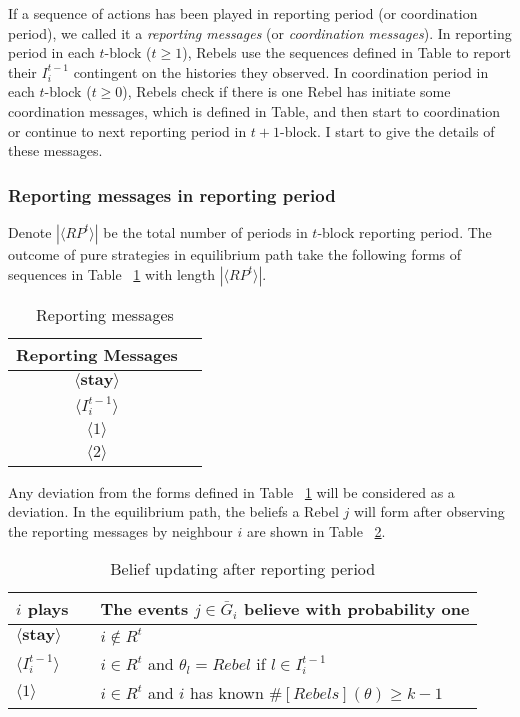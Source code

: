\documentclass[12pt,letter]{article}
\theoremstyle{definition}
\theoremstyle{remark}
\theoremstyle{claim}
\begin{document}
If a sequence of actions has been played in reporting period (or coordination period), we called it a \textit{reporting messages} (or \textit{coordination messages}). In reporting period in each $t$-block ($t\geq 1$), Rebels use the sequences defined in Table to report their $I^{t-1}_i$ contingent on the histories they observed. In coordination period in each $t$-block ($t\geq 0$), Rebels check if there is one Rebel has initiate some coordination messages, which is defined in Table, and then start to coordination or continue to next reporting period in $t+1$-block. I start to give the details of these messages.



\subsubsection*{Reporting messages in reporting period}

Denote $|\langle RP^t \rangle|$ be the total number of periods in $t$-block reporting period. The outcome of pure strategies in equilibrium path take the following forms of sequences in Table ~\ref{Table_msg_reporting} with length $|\langle RP^t \rangle|$.

\begin{table}[t]
\caption{Reporting messages}
\label{Table_msg_reporting}
\begin{center}
\begin{tabular}{c c }
Reporting Messages 		&   \\
\hline
$\langle  \textbf{stay} \rangle$ 	& 	 \\
$\langle  {I^{t-1}_i} \rangle$ 		&   \\
$\langle 1 \rangle$ 		             &   \\
$\langle 2 \rangle$ 		             &   
\end{tabular}
\end{center}
\end{table}
Any deviation from the forms defined in Table ~\ref{Table_msg_reporting} will be considered as a deviation. In the equilibrium path, the beliefs a Rebel $j$ will form after observing the reporting messages by neighbour $i$ are shown in Table ~\ref{Table_blf_up_reporting}.

\begin{table}[t]
\caption{Belief updating after reporting period}
\label{Table_blf_up_reporting}
\begin{center}
\begin{tabular}{l c l}
$i$ plays 		&  			& The events $j\in \bar{G}_i$ believe with probability one  \\
\hline
$\langle  \textbf{stay} \rangle$ 	& 			    & $i\notin R^t$  \\
$\langle  {I^{t-1}_i} \rangle$ 		&  			& $i\in R^t$ and $\theta_l=Rebel$ if $l\in I^{t-1}_i$      \\
$\langle 1 \rangle$ 		             &  			& $i\in R^t$ and $i$ has known $\#[Rebels](\theta)\geq k-1$ \\
\end{tabular}
\end{center}
\end{table}
\end{document}
